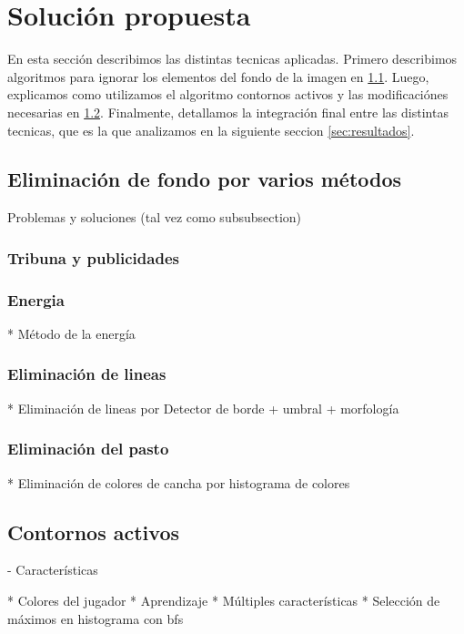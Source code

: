 \section{Solución propuesta}

En esta sección describimos las distintas tecnicas aplicadas. Primero describimos algoritmos para
ignorar los elementos del fondo de la imagen en \ref{sec:background-elimination}. Luego, explicamos
como utilizamos el algoritmo contornos activos\cite{fast-level-set} y las modificaciónes necesarias
en \ref{sec:ac}. Finalmente, detallamos la integración final entre las distintas tecnicas, que es
la que analizamos en la siguiente seccion \ref{sec:resultados}.

\subsection{Eliminación de fondo por varios métodos}
\label{sec:background-elimination}
Problemas y soluciones (tal vez como subsubsection)

\subsubsection{Tribuna y publicidades}

\subsubsection{Energia}
  * Método de la energía

\subsubsection{Eliminación de lineas}
  * Eliminación de lineas por Detector de borde + umbral + morfología

\subsubsection{Eliminación del pasto}
  * Eliminación de colores de cancha por histograma de colores


\subsection{Contornos activos}
\label{sec:ac}

- Características

  * Colores del jugador
  * Aprendizaje
  * Múltiples características
  * Selección de máximos en histograma con bfs

